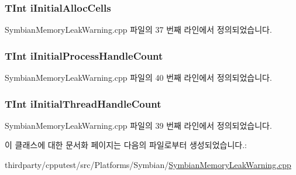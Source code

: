 \subsubsection[{\texorpdfstring{i\+Initial\+Alloc\+Cells}{iInitialAllocCells}}]{\setlength{\rightskip}{0pt plus 5cm}T\+Int i\+Initial\+Alloc\+Cells}\hypertarget{class_memory_leak_warning_data_a8486c917ec96ae308d0e2d08a6be40c3}{}\label{class_memory_leak_warning_data_a8486c917ec96ae308d0e2d08a6be40c3}


Symbian\+Memory\+Leak\+Warning.\+cpp 파일의 37 번째 라인에서 정의되었습니다.

\subsubsection[{\texorpdfstring{i\+Initial\+Process\+Handle\+Count}{iInitialProcessHandleCount}}]{\setlength{\rightskip}{0pt plus 5cm}T\+Int i\+Initial\+Process\+Handle\+Count}\hypertarget{class_memory_leak_warning_data_a99a92506b8f1a0569fbf67193a7fb725}{}\label{class_memory_leak_warning_data_a99a92506b8f1a0569fbf67193a7fb725}


Symbian\+Memory\+Leak\+Warning.\+cpp 파일의 40 번째 라인에서 정의되었습니다.

\subsubsection[{\texorpdfstring{i\+Initial\+Thread\+Handle\+Count}{iInitialThreadHandleCount}}]{\setlength{\rightskip}{0pt plus 5cm}T\+Int i\+Initial\+Thread\+Handle\+Count}\hypertarget{class_memory_leak_warning_data_a083ba8276e92f5bb5db1ad91736efbbe}{}\label{class_memory_leak_warning_data_a083ba8276e92f5bb5db1ad91736efbbe}


Symbian\+Memory\+Leak\+Warning.\+cpp 파일의 39 번째 라인에서 정의되었습니다.



이 클래스에 대한 문서화 페이지는 다음의 파일로부터 생성되었습니다.\+:\begin{DoxyCompactItemize}
\item 
thirdparty/cpputest/src/\+Platforms/\+Symbian/\hyperlink{_symbian_memory_leak_warning_8cpp}{Symbian\+Memory\+Leak\+Warning.\+cpp}\end{DoxyCompactItemize}
